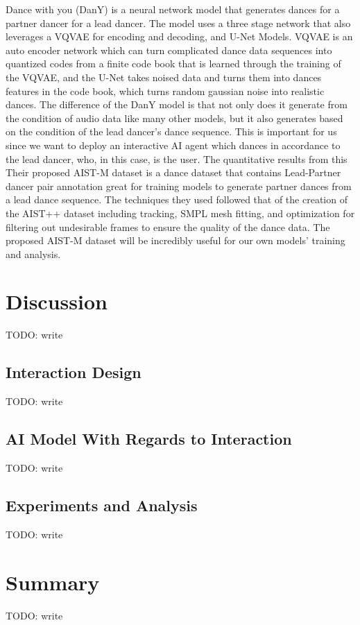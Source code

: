 \documentclass[final,5p,times,twocolumn,authoryear]{article}
\begin{document}
Dance with you (DanY) \cite{Yao2023} is a neural network model that generates
dances for a partner dancer for a lead dancer. The model uses a three
stage network that also leverages a VQVAE for encoding and decoding, and
U-Net Models. VQVAE is an auto encoder network which can turn complicated dance data sequences into quantized
codes from a finite code book that is learned through the training of
the VQVAE, and the U-Net takes noised data and turns them into dances
features in the code book, which turns random gaussian noise into
realistic dances. The difference of the DanY model is that not only does
it generate from the condition of audio data like many other models, but
it also generates based on the condition of the lead dancer's dance
sequence. This is important for us since we want to deploy an
interactive AI agent which dances in accordance to the lead dancer, who,
in this case, is the user. The quantitative results from this 
Their proposed AIST-M dataset is a dance dataset that contains
Lead-Partner dancer pair annotation great for training models to
generate partner dances from a lead dance sequence. The techniques they used followed that of the creation of the
AIST++ dataset \cite{Li2021} including tracking, SMPL mesh fitting, and
optimization for filtering out undesirable frames to ensure the quality
of the dance data. The proposed AIST-M dataset will be incredibly useful
for our own models' training and analysis.

\section{Discussion}

TODO: write

\subsection{Interaction Design}

TODO: write

\subsection{AI Model With Regards to Interaction}

TODO: write

\subsection{Experiments and Analysis}

TODO: write

\section{Summary}

TODO: write

 

\end{document}
